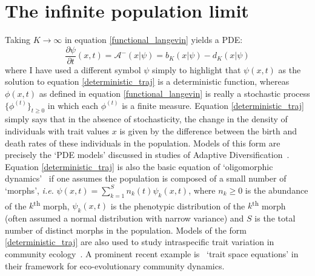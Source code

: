 \section{The infinite population limit}
Taking $K \to \infty$ in equation \eqref{functional_langevin} yields a PDE:
\begin{equation}
\label{deterministic_traj}
\frac{\partial \psi}{\partial t}(x,t) = \mathcal{A}^{-}\left(x|\psi\right) = b_K(x|\psi)- d_K(x|\psi)
\end{equation}
where I have used a different symbol $\psi$ simply to highlight that $\psi(x,t)$ as the solution to equation \eqref{deterministic_traj} is a deterministic function, whereas $\phi(x,t)$ as defined in equation \eqref{functional_langevin} is really a stochastic process $\{\phi^{(t)}\}_{t\geq0}$ in which each $\phi^{(t)}$ is a finite measure. Equation \eqref{deterministic_traj} simply says that in the absence of stochasticity, the change in the density of individuals with trait values $x$ is given by the difference between the birth and death rates of these individuals in the population. Models of this form are precisely the `PDE models' discussed in studies of Adaptive Diversification~\citep{doebeli_adaptive_2011}. Equation \eqref{deterministic_traj} is also the basic equation of `oligomorphic dynamics'~\citep{sasaki_oligomorphic_2011, lion_multimorph_2022} if one assumes the population is composed of a small number of `morphs', \emph{i.e.} $\psi(x,t) = \sum\limits_{k=1}^{S} n_{k}(t)\psi_k(x,t)$, where $n_{k} \geq 0$ is the abundance of the $k$\textsuperscript{th} morph, $\psi_k(x,t)$ is the phenotypic distribution of the $k$\textsuperscript{th} morph (often assumed a normal distribution with narrow variance) and $S$ is the total number of distinct morphs in the population. Models of the form \eqref{deterministic_traj} are also used to study intraspecific trait variation in community ecology~\citep{nordbotten_dynamics_2020}. A prominent recent example is~ `trait space equations' in their framework for eco-evolutionary community dynamics.

